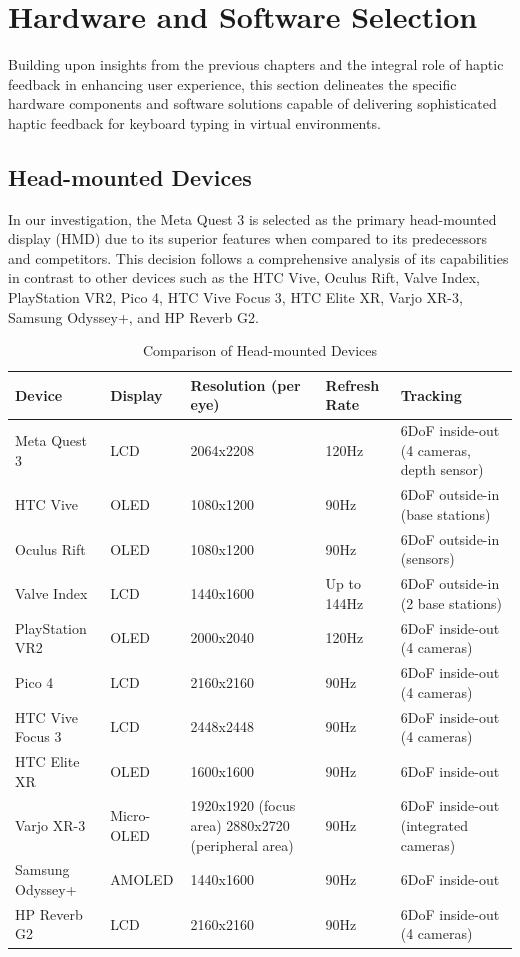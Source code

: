 \chapter{Hardware and Software Selection}
\label{sec:HardwareSoftwareSelection}

Building upon insights from the previous chapters and the integral role of haptic feedback in enhancing user experience, this section delineates the specific hardware components and software solutions capable of delivering sophisticated haptic feedback for keyboard typing in virtual environments.

\section{Head-mounted Devices}
\label{sec:HeadMountedDevices}

In our investigation, the Meta Quest 3 is selected as the primary head-mounted display (HMD) due to its superior features when compared to its predecessors and competitors. This decision follows a comprehensive analysis of its capabilities in contrast to other devices such as the HTC Vive, Oculus Rift, Valve Index, PlayStation VR2, Pico 4, HTC Vive Focus 3, HTC Elite XR, Varjo XR-3, Samsung Odyssey+, and HP Reverb G2.

\begin{table}[h!]
  \centering
  \begin{tabular}{|p{2.5cm}|p{2cm}|p{3cm}|p{2cm}|p{4.5cm}|}
  \hline
  \textbf{Device} & \textbf{Display} & \textbf{Resolution (per eye)} & \textbf{Refresh Rate} & \textbf{Tracking} \\ \hline
  Meta Quest 3 & LCD & 2064x2208 & 120Hz & 6DoF inside-out (4 cameras, depth sensor) \\ \hline
  HTC Vive & OLED & 1080x1200 & 90Hz & 6DoF outside-in (base stations) \\ \hline
  Oculus Rift & OLED & 1080x1200 & 90Hz & 6DoF outside-in (sensors) \\ \hline
  Valve Index & LCD & 1440x1600 & Up to 144Hz & 6DoF outside-in (2 base stations) \\ \hline
  PlayStation VR2 & OLED & 2000x2040 & 120Hz & 6DoF inside-out (4 cameras) \\ \hline
  Pico 4 & LCD & 2160x2160 & 90Hz & 6DoF inside-out (4 cameras) \\ \hline
  HTC Vive Focus 3 & LCD & 2448x2448 & 90Hz & 6DoF inside-out (4 cameras) \\ \hline
  HTC Elite XR & OLED & 1600x1600 & 90Hz & 6DoF inside-out \\ \hline
  Varjo XR-3 & Micro-OLED & 1920x1920 (focus area) \newline 2880x2720 (peripheral area) & 90Hz & 6DoF inside-out (integrated cameras) \\ \hline
  Samsung Odyssey+ & AMOLED & 1440x1600 & 90Hz & 6DoF inside-out \\ \hline
  HP Reverb G2 & LCD & 2160x2160 & 90Hz & 6DoF inside-out (4 cameras) \\ \hline
  \end{tabular}
  \caption{Comparison of Head-mounted Devices}
  \label{table:head_mounted_devices}
  \end{table}
  
